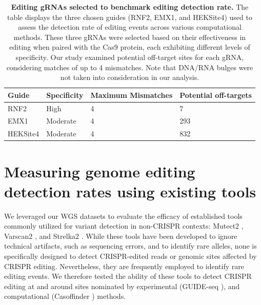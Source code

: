 \documentclass[a4paper, titlepage, openright]{book}
\begin{document}
\begin{table}[!]
    \centering
    \begin{tabular}{|l|l|l|l|}
        \hline
        \textbf{Guide} & \textbf{Specificity} & \textbf{Maximum Mismatches} & \textbf{Potential off-targets} \\ \hline
        RNF2 & High     & 4 & 7   \\ \hline
        EMX1 & Moderate & 4 & 293 \\ \hline
        HEKSite4 & Moderate & 4 & 832 \\ \hline
    \end{tabular}%
    \caption[Editing gRNAs selected to benchmark editing detection rate]{\textbf{Editing gRNAs selected to benchmark editing detection rate.} The table displays the three chosen guides (RNF2, EMX1, and HEKSite4) used to assess the detection rate of editing events across various computational methods. These three gRNAs were selected based on their effectiveness in editing when paired with the Cas9 protein, each exhibiting different levels of specificity. Our study examined potential off-target sites for each gRNA, considering matches of up to 4 mismatches. Note that DNA/RNA bulges were not taken into consideration in our analysis.}
    \label{tab:wgs-guides-table}
\end{table}

\section{Measuring genome editing detection rates using existing tools}
We leveraged our WGS datasets to evaluate the efficacy of established tools commonly utilized for variant detection in non-CRISPR contexts: Mutect2 \citep{mckenna2010genome}, Varscan2 \citep{koboldt2012varscan}, and Strelka2 \citep{kim2018strelka2}. While these tools have been developed to ignore technical artifacts, such as sequencing errors, and to identify rare alleles, none is specifically designed to detect CRISPR-edited reads or genomic sites affected by CRISPR editing. Nevertheless, they are frequently employed to identify rare editing events. We therefore tested the ability of these tools to detect CRISPR editing at and around sites nominated by experimental (GUIDE-seq \citep{tsai2015guide}), and computational (Casoffinder \citep{bae2014cas}) methods. 

\end{document}
